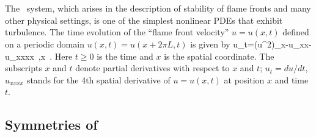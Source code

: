 

\section{\KSe}
\label{s-KS}


The \KS\ system, which
arises in the description of stability of
flame fronts and many other physical settings,
is one of the simplest nonlinear PDEs that
exhibit turbulence.
The time evolution of the ``flame front velocity'' 
$u=u(x,t)$ defined on a periodic domain
$u(x,t) = u(x+2\pi L,t)$
is given by
\beq
	u_t=(u^2)_x-u_{xx}- u_{xxxx}
	\,,\qquad	x \in [0,2\pi L]
	\,.
Here $t \geq 0$ is the time and
$x$ is the spatial coordinate.
The subscripts $x$ and $t$ denote partial derivatives with respect to
$x$ and $t$;
$u_t = du/dt$, $u_{xxxx}$ stands for the 4th spatial
derivative of 
$u=u(x,t)$ at position $x$ and time $t$.





\subsection{Symmetries of \KSe}

